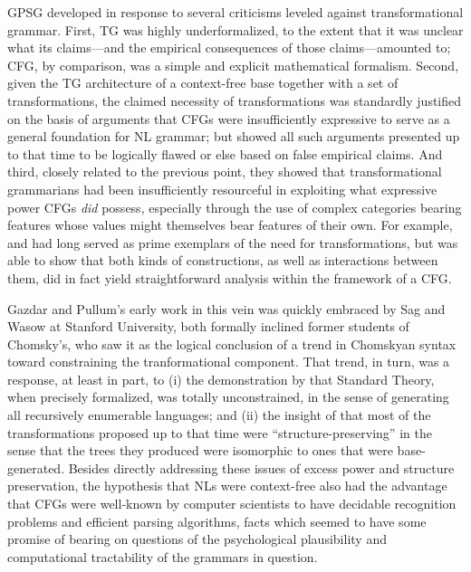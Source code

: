 \documentclass[output=paper]{langsci/langscibook}
\begin{document}
GPSG developed in response to several criticisms leveled against transformational grammar. First, TG was highly underformalized, to the extent that it was unclear what its claims---and the empirical consequences of those claims---amounted to; CFG, by comparison, was a simple and explicit mathematical formalism. Second, given the TG architecture of a context-free base together with a set of transformations, the claimed necessity of transformations was standardly justified on the basis of arguments that CFGs were insufficiently expressive to serve as a general foundation for NL grammar; but \citet{PG82a-u} showed all such arguments presented up to that time to be logically flawed or else based on false empirical claims. And third, closely related to the previous point, they showed that transformational grammarians had been insufficiently resourceful in exploiting what expressive power CFGs \emph{did} possess, especially through the use of complex categories bearing features whose values might themselves bear features of their own.  For example,  and  had long served as prime exemplars of the need for transformations, but \citet{Gazdar81} was able to show that both kinds of constructions, as well as interactions between them, did in fact yield straightforward analysis within the framework of a CFG.
 
Gazdar and Pullum's early work in this vein was quickly embraced by Sag and Wasow at Stanford University, both formally inclined former students of Chomsky's, who saw it as the logical conclusion of a trend in Chomskyan syntax toward constraining the tranformational component. That trend, in turn, was a response, at least in part, to (i) the demonstration by \citet{PR73a-u} that  Standard Theory, when precisely formalized, was totally unconstrained, in the sense of generating all recursively enumerable languages; and (ii) the insight of \citet{Emonds76a-u} that most of the transformations proposed up to that time were ``structure-preserving'' in the sense that the trees they produced were isomorphic to ones that were base-generated. Besides directly addressing these issues of excess power and structure preservation, the hypothesis that NLs were context-free also had the advantage that CFGs were well-known by computer scientists to have decidable recognition problems and efficient parsing algorithms, facts which seemed to have some promise of bearing on questions of the psychological plausibility and computational tractability of the grammars in question.
\end{document}
